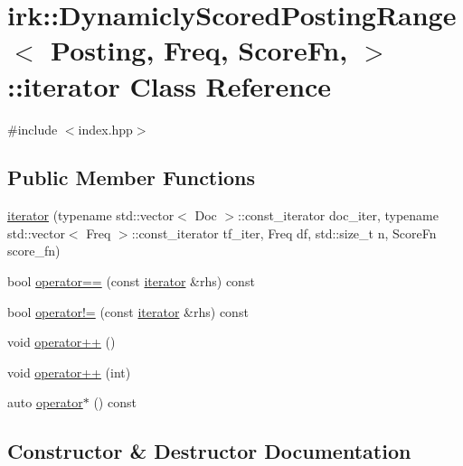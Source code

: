 \hypertarget{classirk_1_1DynamiclyScoredPostingRange_1_1iterator}{}\section{irk\+:\+:Dynamicly\+Scored\+Posting\+Range$<$ Posting, Freq, Score\+Fn, $>$\+:\+:iterator Class Reference}
\label{classirk_1_1DynamiclyScoredPostingRange_1_1iterator}


{\ttfamily \#include $<$index.\+hpp$>$}

\subsection*{Public Member Functions}
\begin{DoxyCompactItemize}
\item 
\mbox{\hyperlink{classirk_1_1DynamiclyScoredPostingRange_1_1iterator_a530877c037107259538c37423aa52ca5}{iterator}} (typename std\+::vector$<$ Doc $>$\+::const\+\_\+iterator doc\+\_\+iter, typename std\+::vector$<$ Freq $>$\+::const\+\_\+iterator tf\+\_\+iter, Freq df, std\+::size\+\_\+t n, Score\+Fn score\+\_\+fn)
\item 
bool \mbox{\hyperlink{classirk_1_1DynamiclyScoredPostingRange_1_1iterator_a4bd7992936beab5e3f67f383f9a8ebf3}{operator==}} (const \mbox{\hyperlink{classirk_1_1DynamiclyScoredPostingRange_1_1iterator}{iterator}} \&rhs) const
\item 
bool \mbox{\hyperlink{classirk_1_1DynamiclyScoredPostingRange_1_1iterator_ab24967cecf580cbfa019f5604695a964}{operator!=}} (const \mbox{\hyperlink{classirk_1_1DynamiclyScoredPostingRange_1_1iterator}{iterator}} \&rhs) const
\item 
void \mbox{\hyperlink{classirk_1_1DynamiclyScoredPostingRange_1_1iterator_a96516b3e741b08e209ac906b371bb532}{operator++}} ()
\item 
void \mbox{\hyperlink{classirk_1_1DynamiclyScoredPostingRange_1_1iterator_a51f9d9fe9f3e6b8ad8f19c38d9118f0b}{operator++}} (int)
\item 
auto \mbox{\hyperlink{classirk_1_1DynamiclyScoredPostingRange_1_1iterator_a96682059e84244fa99b31104ad294835}{operator$\ast$}} () const
\end{DoxyCompactItemize}


\subsection{Constructor \& Destructor Documentation}
\mbox{\label{classirk_1_1DynamiclyScoredPostingRange_1_1iterator_a530877c037107259538c37423aa52ca5}} 
